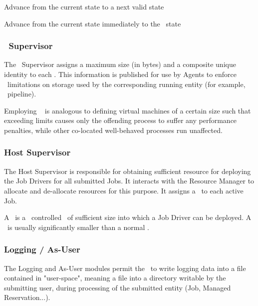 \begin{itemize}
    \begin{description}
    
    \item Advance from the current state to a next valid state
    \item Advance from the current state immediately to the \varCompleted~state
          
    \end{description} 
    
    \subsubsection{\varLinuxControlGroup~Supervisor}  
    
    The \varLinuxControlGroup~Supervisor assigns a maximum size (in bytes) and a composite
    unique identity to each \varShare. This information is published for use
    by Agents to enforce \varLinuxControlGroup~limitations on storage used by the corresponding
    running entity (for example, \varUIMA~pipeline).
    
    Employing \varLinuxControlGroups~ is analogous to defining virtual machines of a certain
    size such that exceeding limits causes only the offending process to suffer
    any performance penalties, while other co-located well-behaved processes
    run unaffected.
    
    \subsubsection{Host Supervisor}
    
    The Host Supervisor is responsible for obtaining sufficient resource for
    deploying the Job Drivers for all submitted Jobs. It interacts with the
    Resource Manager to allocate and de-allocate resources for this purpose.
    It assigns a \varJdShare~to each active Job.
    
    A \varJdShare~is a \varLinuxControlGroup~controlled \varShare~of sufficient size into which a Job
    Driver can be deployed.  A \varJdShare~is usually significantly smaller than
    a normal \varShare.
    
    \subsubsection{Logging / As-User} 
    
    The Logging and As-User modules permit the \varOrchestrator~to write logging data into
    a file contained in "user-space", meaning a file into a directory writable 
    by the submitting user, during processing of the submitted entity 
    (Job, Managed Reservation...).
    

\end{itemize}
